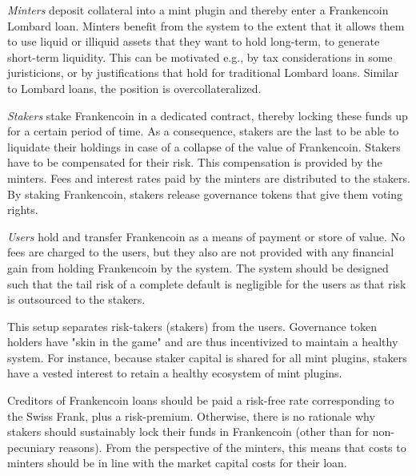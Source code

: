 \documentclass[english,11pt]{article}
\begin{document}
\emph{Minters} deposit collateral into a mint plugin and thereby
enter a Frankencoin Lombard loan. Minters benefit from the system to the extent that it allows them to use liquid or illiquid assets that
they want to hold long-term, to generate short-term liquidity. This
can be motivated e.g., by tax considerations in some juristicions, or
by justifications that hold for traditional Lombard loans.
Similar to Lombard loans, the position is overcollateralized.

\emph{Stakers} stake Frankencoin in a dedicated contract, thereby locking
these funds up for a certain period of time. As a consequence, stakers 
are the last to be able to liquidate their holdings in case of a collapse of the value of Frankencoin. Stakers have to be compensated for their risk. 
This compensation is provided by the minters. Fees and interest rates
paid by the minters are distributed to the stakers. By staking Frankencoin,
stakers release governance tokens that give them voting rights.

\emph{Users} hold and transfer Frankencoin as a means of payment or
store of value. No fees are charged to the users, but they also are not provided with any financial gain from holding Frankencoin by the system. The system should be designed such that the tail risk of a complete default is negligible for the users as that risk is outsourced to the stakers.

This setup separates risk-takers (stakers) from the users.
Governance token holders have "skin in the game" and are thus
incentivized to maintain a healthy system.
For instance, because staker capital is shared for all mint plugins, 
stakers have a vested interest to retain a healthy ecosystem of mint plugins.

Creditors of Frankencoin loans should be paid a risk-free rate
corresponding to the Swiss Frank, plus a risk-premium. Otherwise,
there is no rationale why stakers should sustainably 
lock their funds in Frankencoin (other than for non-pecuniary reasons).
From the perspective of the minters, this means that costs to minters 
should be in line with the market capital costs for their loan.
\end{document}
